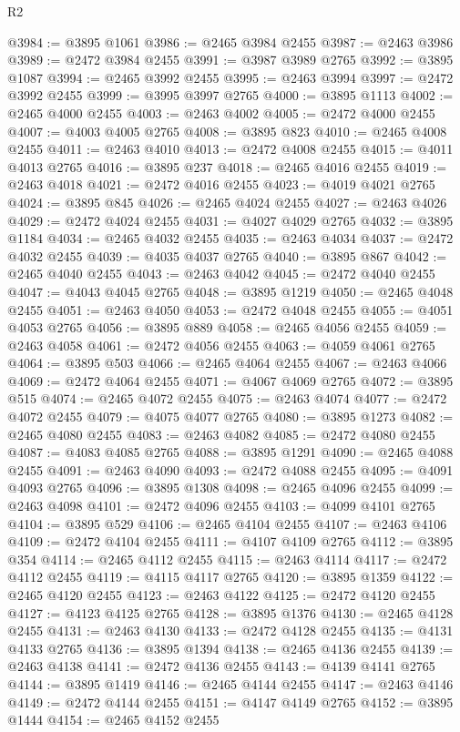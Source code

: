 \begin{lexlean}{R2}
\begin{coremodule}
@3984 := @3895 @1061
@3986 := @2465 @3984 @2455
@3987 := @2463 @3986
@3989 := @2472 @3984 @2455
@3991 := @3987 @3989 @2765
@3992 := @3895 @1087
@3994 := @2465 @3992 @2455
@3995 := @2463 @3994
@3997 := @2472 @3992 @2455
@3999 := @3995 @3997 @2765
@4000 := @3895 @1113
@4002 := @2465 @4000 @2455
@4003 := @2463 @4002
@4005 := @2472 @4000 @2455
@4007 := @4003 @4005 @2765
@4008 := @3895 @823
@4010 := @2465 @4008 @2455
@4011 := @2463 @4010
@4013 := @2472 @4008 @2455
@4015 := @4011 @4013 @2765
@4016 := @3895 @237
@4018 := @2465 @4016 @2455
@4019 := @2463 @4018
@4021 := @2472 @4016 @2455
@4023 := @4019 @4021 @2765
@4024 := @3895 @845
@4026 := @2465 @4024 @2455
@4027 := @2463 @4026
@4029 := @2472 @4024 @2455
@4031 := @4027 @4029 @2765
@4032 := @3895 @1184
@4034 := @2465 @4032 @2455
@4035 := @2463 @4034
@4037 := @2472 @4032 @2455
@4039 := @4035 @4037 @2765
@4040 := @3895 @867
@4042 := @2465 @4040 @2455
@4043 := @2463 @4042
@4045 := @2472 @4040 @2455
@4047 := @4043 @4045 @2765
@4048 := @3895 @1219
@4050 := @2465 @4048 @2455
@4051 := @2463 @4050
@4053 := @2472 @4048 @2455
@4055 := @4051 @4053 @2765
@4056 := @3895 @889
@4058 := @2465 @4056 @2455
@4059 := @2463 @4058
@4061 := @2472 @4056 @2455
@4063 := @4059 @4061 @2765
@4064 := @3895 @503
@4066 := @2465 @4064 @2455
@4067 := @2463 @4066
@4069 := @2472 @4064 @2455
@4071 := @4067 @4069 @2765
@4072 := @3895 @515
@4074 := @2465 @4072 @2455
@4075 := @2463 @4074
@4077 := @2472 @4072 @2455
@4079 := @4075 @4077 @2765
@4080 := @3895 @1273
@4082 := @2465 @4080 @2455
@4083 := @2463 @4082
@4085 := @2472 @4080 @2455
@4087 := @4083 @4085 @2765
@4088 := @3895 @1291
@4090 := @2465 @4088 @2455
@4091 := @2463 @4090
@4093 := @2472 @4088 @2455
@4095 := @4091 @4093 @2765
@4096 := @3895 @1308
@4098 := @2465 @4096 @2455
@4099 := @2463 @4098
@4101 := @2472 @4096 @2455
@4103 := @4099 @4101 @2765
@4104 := @3895 @529
@4106 := @2465 @4104 @2455
@4107 := @2463 @4106
@4109 := @2472 @4104 @2455
@4111 := @4107 @4109 @2765
@4112 := @3895 @354
@4114 := @2465 @4112 @2455
@4115 := @2463 @4114
@4117 := @2472 @4112 @2455
@4119 := @4115 @4117 @2765
@4120 := @3895 @1359
@4122 := @2465 @4120 @2455
@4123 := @2463 @4122
@4125 := @2472 @4120 @2455
@4127 := @4123 @4125 @2765
@4128 := @3895 @1376
@4130 := @2465 @4128 @2455
@4131 := @2463 @4130
@4133 := @2472 @4128 @2455
@4135 := @4131 @4133 @2765
@4136 := @3895 @1394
@4138 := @2465 @4136 @2455
@4139 := @2463 @4138
@4141 := @2472 @4136 @2455
@4143 := @4139 @4141 @2765
@4144 := @3895 @1419
@4146 := @2465 @4144 @2455
@4147 := @2463 @4146
@4149 := @2472 @4144 @2455
@4151 := @4147 @4149 @2765
@4152 := @3895 @1444
@4154 := @2465 @4152 @2455

\end{coremodule}
\end{lexlean}
